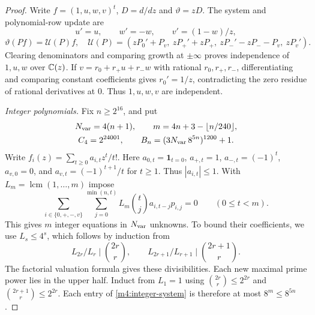 \begin{proof}
Write $f=(1,u,w,v)^t$, $D=d/dz$ and $\vartheta=zD$.
The system and polynomial-row update are
\begin{equation}\label{m4:system}
 u'=u,\qquad w'=-w,\qquad v'=(1-w)/z,
\end{equation}
\begin{equation}\label{m4:row-update}
 \vartheta(Pf)=\mathscr U(P)f,\quad
 \mathscr U(P)=
 (zP_0'+P_v,\ zP_+'+zP_+,\ zP_-'-zP_--P_v,\ zP_v').
\end{equation}
Clearing denominators and comparing growth at $\pm\infty$ proves
independence of $1,u,w$ over $\mathbb{C}(z)$. If
$v=r_0+r_+u+r_-w$ with rational $r_0,r_+,r_-$, differentiating and
comparing constant coefficients gives $r_0'=1/z$, contradicting the
zero residue of rational derivatives at $0$. Thus $1,u,w,v$ are independent.

\emph{Integer polynomials.}
Fix $n\ge2^{16}$, and put
\begin{equation}\label{m4:parameters}
\begin{gathered}
 N_{\rm var}=4(n+1),\qquad m=4n+3-\lfloor n/240\rfloor,\\
 C_4=2^{24001},\qquad B_n=(3N_{\rm var}\,8^{5n})^{1200}+1.
\end{gathered}
\end{equation}
Write $f_i(z)=\sum_{t\ge0}a_{i,t}z^t/t!$.
Here $a_{0,t}=\mathbf1_{t=0}$, $a_{+,t}=1$,
$a_{-,t}=(-1)^t$, $a_{v,0}=0$, and
$a_{v,t}=(-1)^{t+1}/t$ for $t\ge1$.
Thus $|a_{i,t}|\le1$.
With $L_m=\operatorname{lcm}(1,\ldots,m)$ impose
\begin{equation}\label{m4:integer-system}
 \sum_{i\in\{0,+,-,v\}}\sum_{j=0}^{\min(n,t)}
 L_m\binom tj a_{i,t-j}p_{i,j}=0\qquad(0\le t<m).
\end{equation}
This gives $m$ integer equations in $N_{\rm var}$ unknowns. To bound their
coefficients, we use $L_s\le4^s$, which follows by induction from
\[
 L_{2r}/L_r\mid\binom{2r}r,\qquad
 L_{2r+1}/L_{r+1}\mid\binom{2r+1}r.
\]
The factorial valuation formula gives these divisibilities. Each new maximal prime power lies in the upper half. Induct from $L_1=1$ using
$\binom{2r}r\le2^{2r}$ and $\binom{2r+1}r\le2^{2r}$.
Each entry of \eqref{m4:integer-system} is therefore at most $8^m\le8^{5n}$.


\end{proof}
